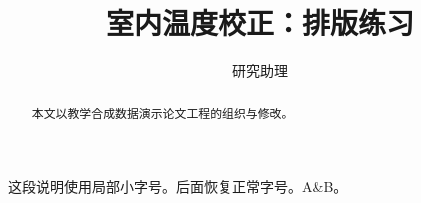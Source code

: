 \documentclass[UTF8,fontset=fandol,a4paper,11pt]{ctexart}
\title{室内温度校正：排版练习}
\author{研究助理}
\date{}
\begin{document}
\maketitle
\begin{abstract}本文以教学合成数据演示论文工程的组织与修改。\end{abstract}
\setcounter{tocdepth}{2}\tableofcontents
{\small 这段说明使用局部小字号。}后面恢复正常字号。A\&B。



\end{document}
